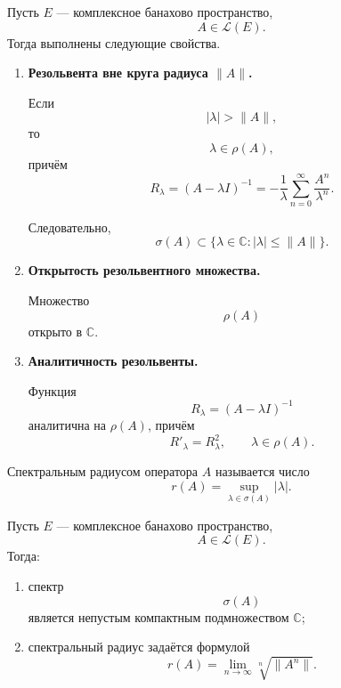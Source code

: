 \begin{theorem}
	Пусть \(E\) --- комплексное банахово пространство,
	\[
	A\in\mathcal{L}(E).
	\]
	Тогда выполнены следующие свойства.
	
	\begin{enumerate}
		\item \textbf{Резольвента вне круга радиуса \(\|A\|\).}
		
		Если
		\[
		|\lambda|>\|A\|,
		\]
		то
		\[
		\lambda\in\rho(A),
		\]
		причём
		\[
		R_\lambda
		=
		(A-\lambda I)^{-1}
		=
		-\frac{1}{\lambda}
		\sum_{n=0}^{\infty}\frac{A^n}{\lambda^n}.
		\]
		
		Следовательно,
		\[
		\sigma(A)
		\subset
		\{\lambda\in\mathbb{C}:|\lambda|\leqslant\|A\|\}.
		\]
		
		\item \textbf{Открытость резольвентного множества.}
		
		Множество
		\[
		\rho(A)
		\]
		открыто в \(\mathbb{C}\).
		
		\item \textbf{Аналитичность резольвенты.}
		
		Функция
		\[
		R_\lambda=(A-\lambda I)^{-1}
		\]
		аналитична на \(\rho(A)\), причём
		\[
		R'_\lambda=R_\lambda^2,
		\qquad
		\lambda\in\rho(A).
		\]
	\end{enumerate}
\end{theorem}

\begin{definition}
	Спектральным радиусом оператора \(A\) называется число
	\[
	r(A)
	=
	\sup_{\lambda\in\sigma(A)}|\lambda|.
	\]
\end{definition}

\begin{theorem}
	Пусть \(E\) --- комплексное банахово пространство,
	\[
	A\in\mathcal{L}(E).
	\]
	Тогда:
	
	\begin{enumerate}
		\item спектр
		\[
		\sigma(A)
		\]
		является непустым компактным подмножеством \(\mathbb{C}\);
		
		\item спектральный радиус задаётся формулой
		\[
		r(A)
		=
		\lim_{n\to\infty}
		\sqrt[n]{\|A^n\|}.
		\]
	\end{enumerate}
\end{theorem}
